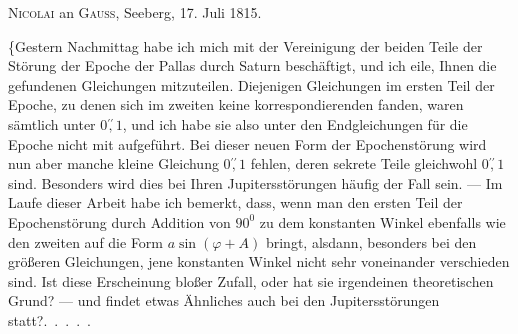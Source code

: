 \par\medskip
{}
\begin{center}
\textsc{Nicolai} an \textsc{Gauss}, Seeberg, 17. Juli 1815.
\end{center}
\par\noindent\hspace*{\parindent}\{Gestern Nachmittag habe ich mich mit der Vereinigung der beiden
Teile der Störung der Epoche der Pallas durch Saturn beschäftigt, und ich
eile, Ihnen die gefundenen Gleichungen mitzuteilen. Diejenigen Gleichungen
im ersten Teil der Epoche, zu denen sich im zweiten keine korrespondierenden
fanden, waren sämtlich unter \(0\overset{\prime\prime}{,}1\), und ich habe sie also unter den
Endgleichungen für die Epoche nicht mit aufgeführt. Bei dieser neuen Form
der Epochenstörung wird nun aber manche kleine Gleichung  \(0\overset{\prime\prime}{,}1\) fehlen,
deren sekrete Teile gleichwohl  \(0\overset{\prime\prime}{,}1\) sind. Besonders wird dies bei
Ihren Jupitersstörungen häufig der Fall sein. --- Im Laufe dieser Arbeit habe
ich bemerkt, dass, wenn man den ersten Teil der Epochenstörung durch
Addition von \(90^0\) zu dem konstanten Winkel ebenfalls wie den zweiten auf
die Form \(a\sin(\varphi+A)\) bringt, alsdann, besonders bei den größeren Gleichungen,
jene konstanten Winkel nicht sehr voneinander verschieden sind. Ist diese
Erscheinung bloßer Zufall, oder hat sie irgendeinen theoretischen Grund?
--- und findet etwas Ähnliches auch bei den Jupitersstörungen statt?\quad .\ .\ .\ .\ .

